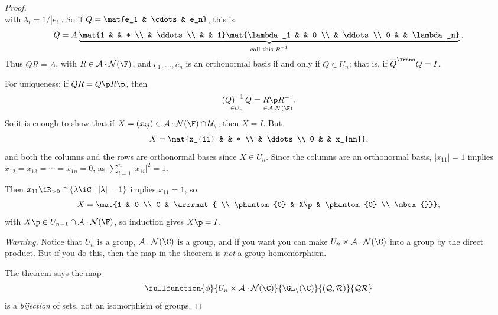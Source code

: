 \begin{proof}
\begin{equation*}
	\end{equation*}
	with $\lambda_i=1/\left\vert \tilde{e}_i \right\vert$. So if $Q=\mat{e_1 & \cdots & e_n}$, this is %
	\begin{equation*}
		Q = A \underbrace{\mat{1 & & * \\ & \ddots \\ & & 1} \mat{\lambda_1 & & 0 \\ & \ddots \\ 0 & & \lambda_n}}_{\text{call this $R^{-1}$}}. %
	\end{equation*}
	Thus $QR=A$, with $R\in \cal{A}\cdot N(\F)$, and $e_1,\ldots,e_n$ is an orthonormal basis if and only if $Q\in U_n$; that is, if $\herm{Q} Q=I$. %
	
	For uniqueness: if $QR=Q\p R\p$, then 
	\begin{equation*}
		\underset{\in U_n}{\left( Q\right)^{-1} Q} = \underset{\in \cal{A}\cdot N(\F)}{R\p R^{-1}}. %
	\end{equation*}
	So it is enough to show that if $X=\left( x_{ij} \right) \in \cal{A}\cdot N(\F) \cap U_n$, then $X=I$. But %
	\begin{equation*}
		X= \mat{x_{11} & & * \\ & \ddots \\ 0 & & x_{nn}},
	\end{equation*}
	and both the columns and the rows are orthonormal bases since $X\in U_n$. Since the columns are an orthonormal basis, $\left\vert x_{11}\right\vert=1 $ implies $x_{12}=x_{13} = \cdots = x_{1n} = 0$, as $\sum_{i=1}^n \left\vert x_{1i} \right\vert^2=1$. %
	
	Then $x_{11}\iR_{>0} \cap \left\{\lambda\iC \mid \left\vert \lambda \right\vert=1\right\}$ implies $x_{11}=1$, so %
	\begin{equation*}
		X = \mat{1 & 0 \\ 0 & \arrrmat{ \\ \phantom{0} & X\p & \phantom{0} \\ \mbox{}}},
	\end{equation*}
	with $X\p\in U_{n-1} \cap \cal{A}\cdot N(\F)$, so induction gives $X\p=I$.
	
	\emph{Warning.} Notice that $U_n$ is a group, $\cal{A}\cdot N(\C)$ is a group, and if you want you can make $U_n\times\cal{A}\cdot N(\C)$ into a group by the direct product. But if you do this, then the map in the theorem is \emph{not} a group homomorphism. %
	
	The theorem says the map
	\begin{equation*}
		\fullfunction{\phi}{U_n\times \cal{A}\cdot N(\C)}{\GL_n(\C)}{(Q,R)}{QR}
	\end{equation*}
	is a \emph{bijection} of sets, not an isomorphism of groups. %


\end{proof}
